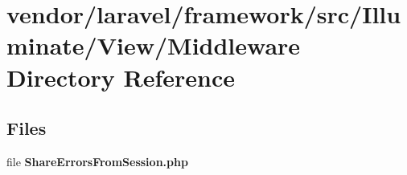 \section{vendor/laravel/framework/src/\+Illuminate/\+View/\+Middleware Directory Reference}
\label{dir_d2fc12bab4c3bb442ba0174f657965a2}
\subsection*{Files}
\begin{DoxyCompactItemize}
\item 
file {\bf Share\+Errors\+From\+Session.\+php}
\end{DoxyCompactItemize}
